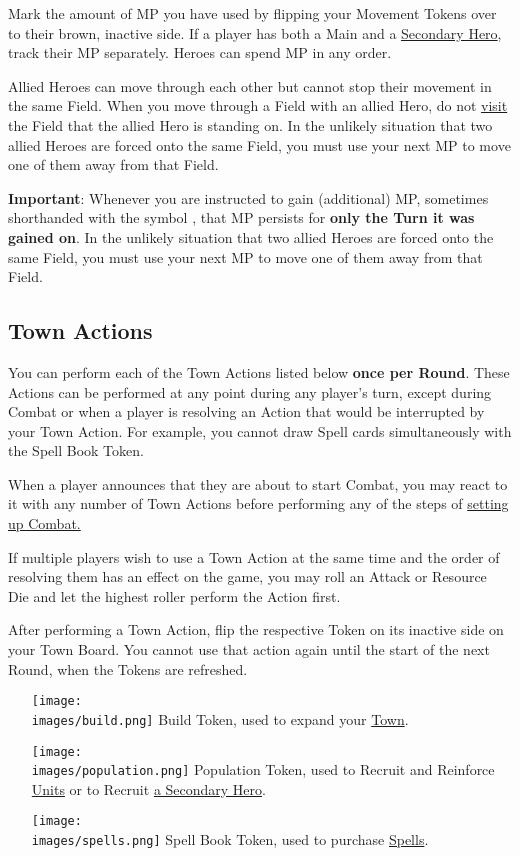 \begin{multicols*}{2}
\bigskip

Mark the amount of MP you have used by flipping your Movement Tokens over to their brown, inactive side.
If a player has both a Main and a \hyperlink{Secondary}{Secondary Hero}, track their MP separately.
Heroes can spend MP in any order.\par
Allied Heroes can move through each other but cannot stop their movement in the same Field.
When you move through a Field with an allied Hero, do not \hyperlink{Categories}{visit} the Field that the allied Hero is standing on.
In the unlikely situation that two allied Heroes are forced onto the same Field, you must use your next MP to move one of them away from that Field.\par
\textbf{Important}: Whenever you are instructed to gain (additional) MP, sometimes shorthanded with the symbol , that MP persists for \textbf{only the Turn it was gained on}.
In the unlikely situation that two allied Heroes are forced onto the same Field, you must use your next MP to move one of them away from that Field.

\subsection*{Town Actions}
You can perform each of the Town Actions listed below \textbf{once per Round}.
These Actions can be performed at any point during any player's turn, except during Combat or when a player is resolving an Action that would be interrupted by your Town Action.
For example, you cannot draw Spell cards simultaneously with the Spell Book Token.\par
When a player announces that they are about to start Combat, you may react to it with any number of Town Actions before performing any of the steps of \hyperlink{Combatsetup}{setting up Combat.}\par
If multiple players wish to use a Town Action at the same time and the order of resolving them has an effect on the game, you may roll an Attack or Resource Die and let the highest roller perform the Action first.\par
After performing a Town Action, flip the respective Token on its inactive side on your Town Board.
You cannot use that action again until the start of the next Round, when the Tokens are refreshed.
\begin{itemize}
  \item [{\texttt{[image: \\images/build.png]}}] Build Token, used to expand your \hyperlink{Town}{Town}.
  \item [{\texttt{[image: \\images/population.png]}}] Population Token, used to Recruit and Reinforce \hyperlink{Units}{Units} or to Recruit \hyperlink{Secondary}{a Secondary Hero}.
  \item [{\texttt{[image: \\images/spells.png]}}]Spell Book Token, used to purchase \hyperlink{spells}{Spells}.
\end{itemize}


\end{multicols*}

